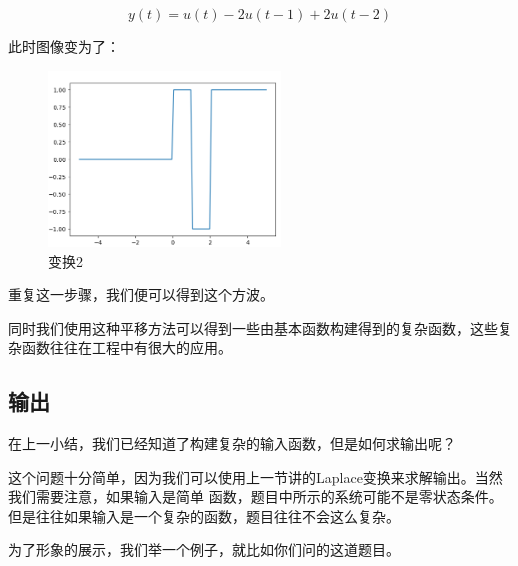 \documentclass{ctexart}
\begin{document}
\begin{equation}
    y(t) = u(t) - 2u(t-1) + 2u(t-2)
\end{equation}

此时图像变为了：

\begin{figure}[H]
    \centering
    \includegraphics[width=0.55\textwidth]{./pics/deeply_understand_control_theory/step_transform2.png}
    \caption{变换2}
    \label{Fig.6}
\end{figure}

重复这一步骤，我们便可以得到这个方波。

同时我们使用这种平移方法可以得到一些由基本函数构建得到的复杂函数，这些复杂函数往往在工程中有很大的应用。

\subsection*{输出}
在上一小结，我们已经知道了构建复杂的输入函数，但是如何求输出呢？

这个问题十分简单，因为我们可以使用上一节讲的Laplace变换来求解输出。当然我们需要注意，如果输入是简单
函数，题目中所示的系统可能不是零状态条件。但是往往如果输入是一个复杂的函数，题目往往不会这么复杂。

为了形象的展示，我们举一个例子，就比如你们问的这道题目。
\end{document}
